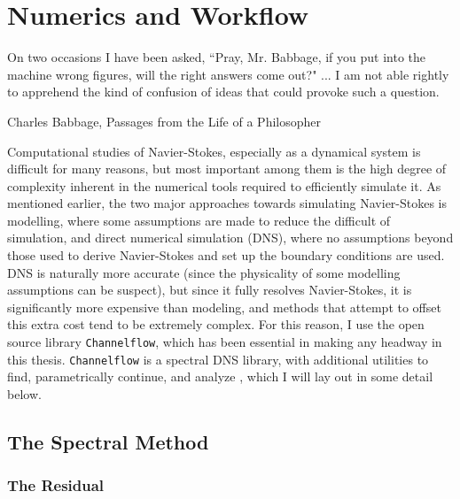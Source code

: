 \chapter{Numerics and Workflow}

    	 	\epigraph{On two occasions I have been asked, ``Pray, Mr. Babbage, if you put into the machine wrong figures, will the right answers come out?" ... I am not able rightly to apprehend the kind of confusion of ideas that could provoke such a question.}{Charles Babbage, Passages from the Life of a Philosopher}

Computational studies of Navier-Stokes, especially as a dynamical system is difficult for many reasons, but most important among them is the high degree of complexity inherent in the numerical tools required to efficiently simulate it. As mentioned earlier, the two major approaches towards simulating Navier-Stokes  is modelling, where some assumptions are made to reduce the difficult of simulation, and direct numerical simulation (DNS), where no assumptions beyond those used to derive Navier-Stokes and set up the boundary conditions are used. DNS is naturally more accurate (since the physicality of some modelling assumptions can be suspect), but since it fully resolves Navier-Stokes, it is significantly more expensive than modeling, and methods that attempt to offset this extra cost tend to be extremely complex. For this reason, I use the open source library {\tt Channelflow}, which has been essential in making any headway in this thesis. {\tt Channelflow} is a spectral DNS library, with additional utilities to find, parametrically continue, and analyze \ecs, which I will lay out in some detail below.
\section{The Spectral Method}
\subsection{The Residual}

